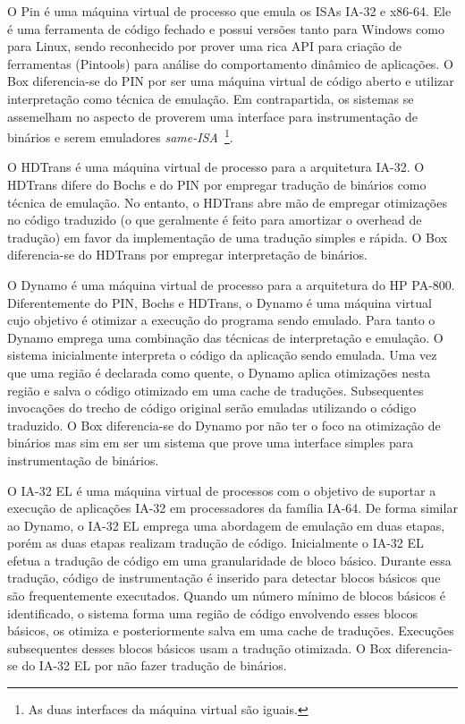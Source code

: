 \documentclass[11pt,twoside]{article}
\begin{document}
O Pin \cite{Luk2005} é uma máquina virtual de processo que emula os ISAs IA-32 e x86-64. 
Ele é uma ferramenta de código fechado e possui versões tanto para Windows como para Linux, sendo reconhecido por prover uma rica API para criação de ferramentas (Pintools) para análise do comportamento dinâmico de aplicações. 
O Box diferencia-se do PIN por ser uma máquina virtual de código aberto e utilizar interpretação como técnica de emulação.
Em contrapartida, os sistemas se assemelham no aspecto de proverem uma interface para instrumentação de binários e serem emuladores \emph{same-ISA}~\footnote{As duas interfaces da máquina virtual são iguais.}.

O HDTrans \cite{Sridhar2006} é uma máquina virtual de processo para a arquitetura IA-32.
O HDTrans difere do Bochs e do PIN por empregar tradução de binários como técnica de emulação.
No entanto, o HDTrans abre mão de empregar otimizações no código traduzido (o que geralmente é feito para amortizar o overhead de tradução) em favor da implementação de uma tradução simples e rápida.
O Box diferencia-se do HDTrans por empregar interpretação de binários.

O Dynamo \cite{Bala2000} é uma máquina virtual de processo para a arquitetura do HP PA-800. 
Diferentemente do PIN, Bochs e HDTrans, o Dynamo é uma máquina virtual cujo objetivo é otimizar a execução do programa sendo emulado.
Para tanto o Dynamo emprega uma combinação das técnicas de interpretação e emulação. 
O sistema inicialmente interpreta o código da aplicação sendo emulada. 
Uma vez que uma região é declarada como quente, o Dynamo aplica otimizações nesta região e salva o código otimizado em uma cache de traduções. 
Subsequentes invocações do trecho de código original serão emuladas utilizando o código traduzido. 
O Box diferencia-se do Dynamo por não ter o foco na otimização de binários mas sim em ser um sistema que prove uma interface simples para 
instrumentação de binários.

O IA-32 EL \cite{Baraz2003} é uma máquina virtual de processos com o objetivo de suportar a execução de aplicações IA-32 em processadores da família IA-64.
De forma similar ao Dynamo, o IA-32 EL emprega uma abordagem de emulação em duas etapas, porém as duas etapas realizam tradução de código. 
Inicialmente o IA-32 EL efetua a tradução de código em uma granularidade de bloco básico.
Durante essa tradução, código de instrumentação é inserido para detectar blocos básicos que são frequentemente executados. 
Quando um número mínimo de blocos básicos é identificado, o sistema forma uma região de código envolvendo esses blocos básicos, os otimiza e posteriormente salva em uma cache de traduções. 
Execuções subsequentes desses blocos básicos usam a tradução otimizada. 
O Box diferencia-se do IA-32 EL por não fazer tradução de binários.
\end{document}
